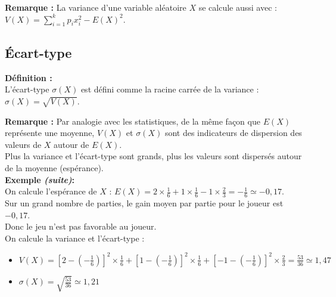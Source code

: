 \documentclass{article}
\begin{document}
\textbf{Remarque :} La variance d'une variable aléatoire $X$ se calcule aussi avec : $V(X)=\sum_{i=1}^{k} p_i x_i^2-E(X)^2$.
\subsection{Écart-type}

\begin{mdframed}[style=definitionStyle]
    \textbf{Définition :} ~\\
    L'écart-type $\sigma(X)$ est défini comme la racine carrée de la variance : $\sigma(X)=\sqrt{V(X)}$.
\end{mdframed}

\textbf{Remarque :} Par analogie avec les statistiques, de la même façon que $E(X)$ représente une moyenne, $V(X)$ et $\sigma(X)$ sont des indicateurs de dispersion des valeurs de $X$ autour de $E(X)$. \\
Plus la variance et l'écart-type sont grands, plus les valeurs sont dispersés autour de la moyenne (espérance). \\

\textbf{Exemple \emph{(suite)}:} ~\\
On calcule l'espérance de $X$ :
$\displaystyle E(X)=2\times\frac{1}{6}+1\times\frac{1}{6}-1\times\frac{2}{3}=-\frac{1}{6}\simeq-0,17$. \\
Sur un grand nombre de parties, le gain moyen par partie pour le joueur est $-0,17$. \\Donc le jeu n'est pas favorable au joueur. \\

On calcule la variance et l'écart-type :
\begin{itemize}
    \item $\displaystyle V(X)=\left[2-\left(-\frac{1}{6}\right)\right]^2\times \frac{1}{6}+\left[1-\left(-\frac{1}{6}\right)\right]^2\times \frac{1}{6}+\left[-1-\left(-\frac{1}{6}\right)\right]^2\times \frac{2}{3}=\frac{53}{36}\simeq1,47$
    \item $\displaystyle \sigma(X)=\sqrt{\frac{53}{36}}\simeq1,21$
\end{itemize}
\end{document}
